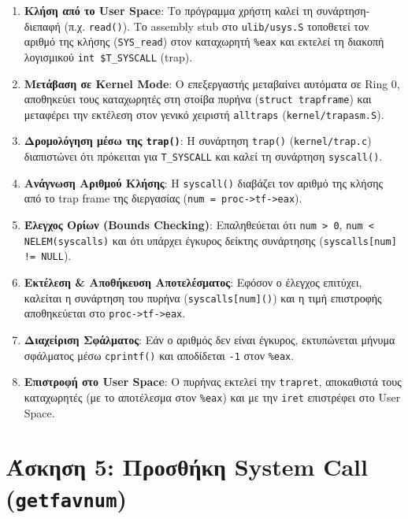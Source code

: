 \documentclass[11pt,a4paper]{article}
\begin{document}
\begin{enumerate}[topsep=1pt, itemsep=0.5pt, parsep=0pt]
    \item \textbf{Κλήση από το User Space}: Το πρόγραμμα χρήστη καλεί τη συνάρτηση-διεπαφή (π.χ. \texttt{read()}). 
    Το assembly stub στο \texttt{ulib/usys.S} τοποθετεί τον αριθμό της κλήσης (\texttt{SYS\_read}) στον καταχωρητή \texttt{\%eax} 
    και εκτελεί τη διακοπή λογισμικού \texttt{int \$T\_SYSCALL} (trap).
    \item \textbf{Μετάβαση σε Kernel Mode}: Ο επεξεργαστής μεταβαίνει αυτόματα σε Ring 0, αποθηκεύει τους καταχωρητές στη στοίβα 
    πυρήνα (\texttt{struct trapframe}) και μεταφέρει την εκτέλεση στον γενικό χειριστή \texttt{alltraps} (\texttt{kernel/trapasm.S}).
    \item \textbf{Δρομολόγηση μέσω της \texttt{trap()}}: Η συνάρτηση \texttt{trap()} (\texttt{kernel/trap.c}) διαπιστώνει ότι πρόκειται 
    για \texttt{T\_SYSCALL} και καλεί τη συνάρτηση \texttt{syscall()}.
    \item \textbf{Ανάγνωση Αριθμού Κλήσης}: Η \texttt{syscall()} διαβάζει τον αριθμό της κλήσης από το trap frame της 
    διεργασίας (\texttt{num = proc->tf->eax}).
    \item \textbf{Έλεγχος Ορίων (Bounds Checking)}: Επαληθεύεται ότι \texttt{num > 0}, \texttt{num < NELEM(syscalls)} και ότι υπάρχει
    έγκυρος δείκτης συνάρτησης (\texttt{syscalls[num] != NULL}).
    \item \textbf{Εκτέλεση \& Αποθήκευση Αποτελέσματος}: Εφόσον ο έλεγχος επιτύχει, καλείται η συνάρτηση του πυρήνα
    (\texttt{syscalls[num]()}) και η τιμή επιστροφής αποθηκεύεται στο \texttt{proc->tf->eax}.
    \item \textbf{Διαχείριση Σφάλματος}: Εάν ο αριθμός δεν είναι έγκυρος, εκτυπώνεται μήνυμα σφάλματος μέσω \texttt{cprintf()} 
    και αποδίδεται \texttt{-1} στον \texttt{\%eax}.
    \item \textbf{Επιστροφή στο User Space}: Ο πυρήνας εκτελεί την \texttt{trapret}, αποκαθιστά τους καταχωρητές 
    (με το αποτέλεσμα στον \texttt{\%eax}) και με την \texttt{iret} επιστρέφει στο User Space.
\end{enumerate}


\clearpage
\section{Άσκηση 5: Προσθήκη System Call (\texttt{getfavnum})}
\end{document}
